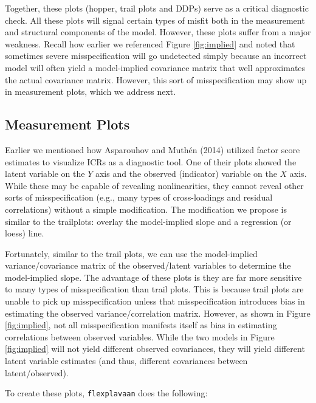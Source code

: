 \documentclass[
  english,
  man]{apa6}
\begin{document}
Together, these plots (hopper, trail plots and DDPs) serve as a critical diagnostic check. All these plots will signal certain types of misfit both in the measurement and structural components of the model. However, these plots suffer from a major weakness. Recall how earlier we referenced Figure \ref{fig:implied} and noted that sometimes severe misspecification will go undetected simply because an incorrect model will often yield a model-implied covariance matrix that well approximates the actual covariance matrix. However, this sort of misspecification may show up in measurement plots, which we address next.

\hypertarget{measurement-plots}{%
\subsection{Measurement Plots}\label{measurement-plots}}

Earlier we mentioned how Asparouhov and Muthén (2014) utilized factor score estimates to visualize ICRs as a diagnostic tool. One of their plots showed the latent variable on the \(Y\) axis and the observed (indicator) variable on the \(X\) axis. While these may be capable of revealing nonlinearities, they cannot reveal other sorts of misspecification (e.g., many types of cross-loadings and residual correlations) without a simple modification. The modification we propose is similar to the trailplots: overlay the model-implied slope and a regression (or loess) line.

Fortunately, similar to the trail plots, we can use the model-implied variance/covariance matrix of the observed/latent variables to determine the model-implied slope. The advantage of these plots is they are far more sensitive to many types of misspecification than trail plots. This is because trail plots are unable to pick up misspecification unless that misspecification introduces bias in estimating the observed variance/correlation matrix. However, as shown in Figure \ref{fig:implied}, not all misspecification manifests itself as bias in estimating correlations between observed variables. While the two models in Figure \ref{fig:implied} will not yield different observed covariances, they will yield different latent variable estimates (and thus, different covariances between latent/observed).

To create these plots, \texttt{flexplavaan} does the following:
\end{document}
